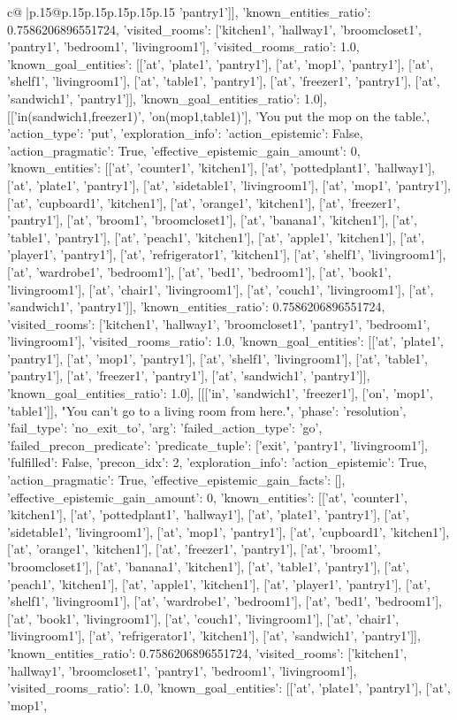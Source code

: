 \documentclass{article}
\begin{document}
{\begin{supertabular}{c@{$\;$}|p{.15\linewidth}@{}p{.15\linewidth}p{.15\linewidth}p{.15\linewidth}p{.15\linewidth}p{.15\linewidth}}
{{{'pantry1']], 'known_entities_ratio': 0.7586206896551724, 'visited_rooms': ['kitchen1', 'hallway1', 'broomcloset1', 'pantry1', 'bedroom1', 'livingroom1'], 'visited_rooms_ratio': 1.0, 'known_goal_entities': [['at', 'plate1', 'pantry1'], ['at', 'mop1', 'pantry1'], ['at', 'shelf1', 'livingroom1'], ['at', 'table1', 'pantry1'], ['at', 'freezer1', 'pantry1'], ['at', 'sandwich1', 'pantry1']], 'known_goal_entities_ratio': 1.0}}], [['in(sandwich1,freezer1)', 'on(mop1,table1)'], 'You put the mop on the table.', {'action_type': 'put', 'exploration_info': {'action_epistemic': False, 'action_pragmatic': True, 'effective_epistemic_gain_amount': 0, 'known_entities': [['at', 'counter1', 'kitchen1'], ['at', 'pottedplant1', 'hallway1'], ['at', 'plate1', 'pantry1'], ['at', 'sidetable1', 'livingroom1'], ['at', 'mop1', 'pantry1'], ['at', 'cupboard1', 'kitchen1'], ['at', 'orange1', 'kitchen1'], ['at', 'freezer1', 'pantry1'], ['at', 'broom1', 'broomcloset1'], ['at', 'banana1', 'kitchen1'], ['at', 'table1', 'pantry1'], ['at', 'peach1', 'kitchen1'], ['at', 'apple1', 'kitchen1'], ['at', 'player1', 'pantry1'], ['at', 'refrigerator1', 'kitchen1'], ['at', 'shelf1', 'livingroom1'], ['at', 'wardrobe1', 'bedroom1'], ['at', 'bed1', 'bedroom1'], ['at', 'book1', 'livingroom1'], ['at', 'chair1', 'livingroom1'], ['at', 'couch1', 'livingroom1'], ['at', 'sandwich1', 'pantry1']], 'known_entities_ratio': 0.7586206896551724, 'visited_rooms': ['kitchen1', 'hallway1', 'broomcloset1', 'pantry1', 'bedroom1', 'livingroom1'], 'visited_rooms_ratio': 1.0, 'known_goal_entities': [['at', 'plate1', 'pantry1'], ['at', 'mop1', 'pantry1'], ['at', 'shelf1', 'livingroom1'], ['at', 'table1', 'pantry1'], ['at', 'freezer1', 'pantry1'], ['at', 'sandwich1', 'pantry1']], 'known_goal_entities_ratio': 1.0}}], [[['in', 'sandwich1', 'freezer1'], ['on', 'mop1', 'table1']], "You can't go to a living room from here.", {'phase': 'resolution', 'fail_type': 'no_exit_to', 'arg': {'failed_action_type': 'go', 'failed_precon_predicate': {'predicate_tuple': ['exit', 'pantry1', 'livingroom1'], 'fulfilled': False, 'precon_idx': 2}}, 'exploration_info': {'action_epistemic': True, 'action_pragmatic': True, 'effective_epistemic_gain_facts': [], 'effective_epistemic_gain_amount': 0, 'known_entities': [['at', 'counter1', 'kitchen1'], ['at', 'pottedplant1', 'hallway1'], ['at', 'plate1', 'pantry1'], ['at', 'sidetable1', 'livingroom1'], ['at', 'mop1', 'pantry1'], ['at', 'cupboard1', 'kitchen1'], ['at', 'orange1', 'kitchen1'], ['at', 'freezer1', 'pantry1'], ['at', 'broom1', 'broomcloset1'], ['at', 'banana1', 'kitchen1'], ['at', 'table1', 'pantry1'], ['at', 'peach1', 'kitchen1'], ['at', 'apple1', 'kitchen1'], ['at', 'player1', 'pantry1'], ['at', 'shelf1', 'livingroom1'], ['at', 'wardrobe1', 'bedroom1'], ['at', 'bed1', 'bedroom1'], ['at', 'book1', 'livingroom1'], ['at', 'couch1', 'livingroom1'], ['at', 'chair1', 'livingroom1'], ['at', 'refrigerator1', 'kitchen1'], ['at', 'sandwich1', 'pantry1']], 'known_entities_ratio': 0.7586206896551724, 'visited_rooms': ['kitchen1', 'hallway1', 'broomcloset1', 'pantry1', 'bedroom1', 'livingroom1'], 'visited_rooms_ratio': 1.0, 'known_goal_entities': [['at', 'plate1', 'pantry1'], ['at', 'mop1', }}}
\end{supertabular}}
\end{document}
